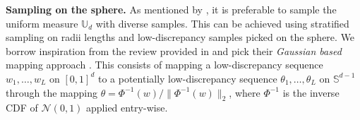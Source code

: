 \textbf{Sampling on the sphere.}
As mentioned by \citet{hallin2021}, it is preferable to sample the uniform measure $\mathbb{U}_d$ with diverse samples. This can be achieved using stratified sampling on radii lengths and low-discrepancy samples picked on the sphere. We borrow inspiration from the review provided in \citep{nguyenquasi} and pick their \textit{Gaussian based} mapping approach \citep{basu2016quasi}. This consists %
of mapping a low-discrepancy sequence $w_1,\ldots,w_L$ on $[0,1]^d$ to a potentially low-discrepancy sequence $\theta_1,\ldots,\theta_L$ on $\mathbb{S}^{d-1}$ through the mapping $\theta= \Phi^{-1}(w)/\|\Phi^{-1}(w)\|_2$, where $\Phi^{-1}$ is the inverse CDF of $\mathcal{N}(0,1)$ applied entry-wise.







